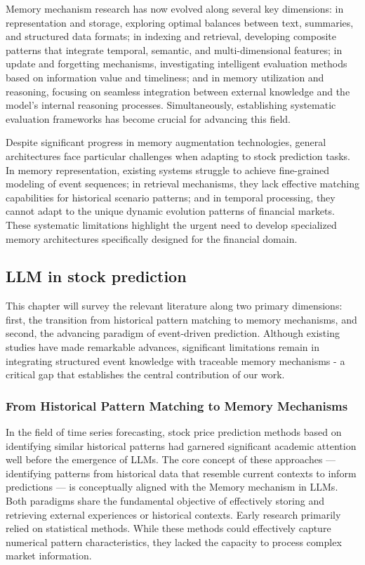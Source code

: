 \documentclass[sigconf, nonacm]{acmart} %
\begin{document}
Memory mechanism research has now evolved along several key dimensions: in representation and storage, exploring optimal balances between text, summaries, and structured data formats; in indexing and retrieval, developing composite patterns that integrate temporal, semantic, and multi-dimensional features; in update and forgetting mechanisms, investigating intelligent evaluation methods based on information value and timeliness; and in memory utilization and reasoning, focusing on seamless integration between external knowledge and the model's internal reasoning processes. Simultaneously, establishing systematic evaluation frameworks has become crucial for advancing this field.

Despite significant progress in memory augmentation technologies, general architectures face particular challenges when adapting to stock prediction tasks. In memory representation, existing systems struggle to achieve fine-grained modeling of event sequences; in retrieval mechanisms, they lack effective matching capabilities for historical scenario patterns; and in temporal processing, they cannot adapt to the unique dynamic evolution patterns of financial markets. These systematic limitations highlight the urgent need to develop specialized memory architectures specifically designed for the financial domain.

%
\subsection{LLM in stock prediction}
This chapter will survey the relevant literature along two primary dimensions: first, the transition from historical pattern matching to memory mechanisms, and second, the advancing paradigm of event-driven prediction. Although existing studies have made remarkable advances, significant limitations remain in integrating structured event knowledge with traceable memory mechanisms - a critical gap that establishes the central contribution of our work.
\subsubsection{From Historical Pattern Matching to Memory Mechanisms}
In the field of time series forecasting, stock price prediction methods based on identifying similar historical patterns had garnered significant academic attention well before the emergence of LLMs. The core concept of these approaches — identifying patterns from historical data that resemble current contexts to inform predictions — is conceptually aligned with the Memory mechanism in LLMs. Both paradigms share the fundamental objective of effectively storing and retrieving external experiences or historical contexts. Early research primarily relied on statistical methods. 
While these methods could effectively capture numerical pattern characteristics, they lacked the capacity to process complex market information.
\end{document}

